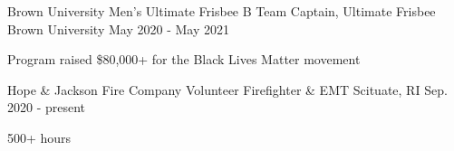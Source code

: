 

\begin{cventries}

\vspace{-1mm}
  \cventry
    {Brown University Men's Ultimate Frisbee B Team} %
    {Captain, Ultimate Frisbee} %
    {Brown University} %
    {May 2020 - May 2021} %
    {
      \begin{cvitems} %
        \item {Program raised \$80,000+ for the Black Lives Matter movement}
      \end{cvitems}
    }

\vspace{-1mm}
  \cventry
    {Hope \& Jackson Fire Company} %
    {Volunteer Firefighter \& EMT} %
    {Scituate, RI} %
    {Sep. 2020 - present} %
    {
      \begin{cvitems} %
        \item {500+ hours}
      \end{cvitems}
    }

\end{cventries}
